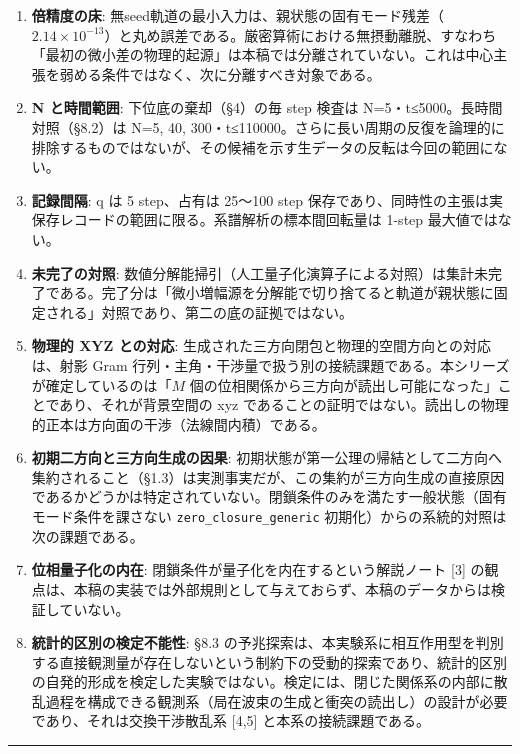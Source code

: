 \documentclass[
  a4paper,
]{ltjsarticle}
\providecommand{\tightlist}{%
  \setlength{\itemsep}{0pt}\setlength{\parskip}{0pt}}
\begin{document}
\begin{enumerate}
\def\labelenumi{\arabic{enumi}.}
\tightlist
\item
  \textbf{倍精度の床}:
  無seed軌道の最小入力は、親状態の固有モード残差（\(2.14\times10^{-13}\)）と丸め誤差である。厳密算術における無摂動離脱、すなわち「最初の微小差の物理的起源」は本稿では分離されていない。これは中心主張を弱める条件ではなく、次に分離すべき対象である。
\item
  \textbf{N と時間範囲}: 下位底の棄却（§4）の毎 step 検査は
  N=5・t≤5000。長時間対照（§8.2）は N=5, 40,
  300・t≤110000。さらに長い周期の反復を論理的に排除するものではないが、その候補を示す生データの反転は今回の範囲にない。
\item
  \textbf{記録間隔}: q は 5 step、占有は 25〜100 step
  保存であり、同時性の主張は実保存レコードの範囲に限る。系譜解析の標本間回転量は
  1-step 最大値ではない。
\item
  \textbf{未完了の対照}:
  数値分解能掃引（人工量子化演算子による対照）は集計未完了である。完了分は「微小増幅源を分解能で切り捨てると軌道が親状態に固定される」対照であり、第二の底の証拠ではない。
\item
  \textbf{物理的 XYZ との対応}:
  生成された三方向閉包と物理的空間方向との対応は、射影 Gram
  行列・主角・干渉量で扱う別の接続課題である。本シリーズが確定しているのは「\(M\)
  個の位相関係から三方向が読出し可能になった」ことであり、それが背景空間の
  xyz
  であることの証明ではない。読出しの物理的正本は方向面の干渉（法線間内積）である。
\item
  \textbf{初期二方向と三方向生成の因果}:
  初期状態が第一公理の帰結として二方向へ集約されること（§1.3）は実測事実だが、この集約が三方向生成の直接原因であるかどうかは特定されていない。閉鎖条件のみを満たす一般状態（固有モード条件を課さない
  \texttt{zero\_closure\_generic}
  初期化）からの系統的対照は次の課題である。
\item
  \textbf{位相量子化の内在}: 閉鎖条件が量子化を内在するという解説ノート
  {[}3{]}
  の観点は、本稿の実装では外部規則として与えておらず、本稿のデータからは検証していない。
\item
  \textbf{統計的区別の検定不能性}: §8.3
  の予兆探索は、本実験系に相互作用型を判別する直接観測量が存在しないという制約下の受動的探索であり、統計的区別の自発的形成を検定した実験ではない。検定には、閉じた関係系の内部に散乱過程を構成できる観測系（局在波束の生成と衝突の読出し）の設計が必要であり、それは交換干渉散乱系
  {[}4,5{]} と本系の接続課題である。
\end{enumerate}

\begin{center}\rule{0.5\linewidth}{0.5pt}\end{center}
\end{document}

